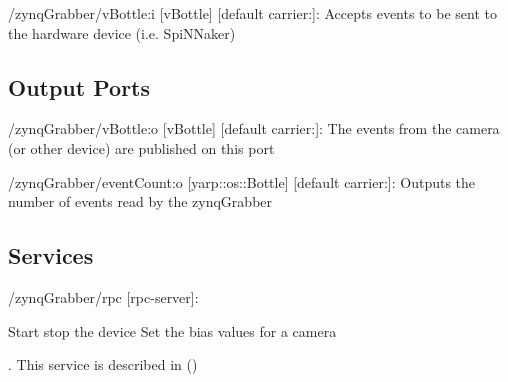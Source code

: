 \begin{DoxyItemize}
\item /zynq\+Grabber/v\+Bottle\+:i \mbox{[}v\+Bottle\mbox{]} \mbox{[}default carrier\+:\mbox{]}\+: Accepts events to be sent to the hardware device (i.\+e. Spi\+N\+Naker)
\end{DoxyItemize}\hypertarget{group__zynqGrabber_outputports_sec}{}\subsection{Output Ports}\label{group__zynqGrabber_outputports_sec}

\begin{DoxyItemize}
\item /zynq\+Grabber/v\+Bottle\+:o \mbox{[}v\+Bottle\mbox{]} \mbox{[}default carrier\+:\mbox{]}\+: The events from the camera (or other device) are published on this port
\item /zynq\+Grabber/event\+Count\+:o \mbox{[}yarp\+::os\+::\+Bottle\mbox{]} \mbox{[}default carrier\+:\mbox{]}\+: Outputs the number of events read by the zynq\+Grabber
\end{DoxyItemize}\hypertarget{group__zynqGrabber_services_sec}{}\subsection{Services}\label{group__zynqGrabber_services_sec}

\begin{DoxyItemize}
\item /zynq\+Grabber/rpc \mbox{[}rpc-\/server\mbox{]}\+: \begin{DoxyVerb}   Start stop the device
   Set the bias values for a camera
\end{DoxyVerb}


. This service is described in () 
\end{DoxyItemize}